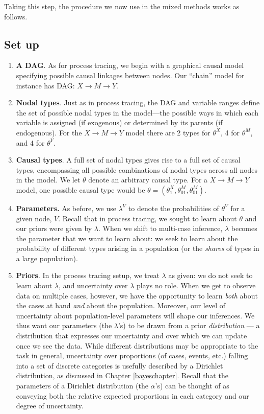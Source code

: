 \documentclass[
  12pt,
]{book}
\begin{document}
Taking this step, the procedure we now use in the mixed methods works as follows.

\hypertarget{set-up}{%
\subsection{Set up}\label{set-up}}

\begin{enumerate}
\def\labelenumi{\arabic{enumi}.}
\item
  \textbf{A DAG}. As for process tracing, we begin with a graphical causal model specifying possible causal linkages between nodes. Our ``chain'' model for instance has DAG: \(X \rightarrow M \rightarrow Y\).
\item
  \textbf{Nodal types}. Just as in process tracing, the DAG and variable ranges define the set of possible nodal types in the model---the possible ways in which each variable is assigned (if exogenous) or determined by its parents (if endogenous). For the \(X \rightarrow M \rightarrow Y\) model there are 2 types for \(\theta^X\), 4 for \(\theta^M\), and 4 for \(\theta^Y\).
\item
  \textbf{Causal types}. A full set of nodal types gives rise to a full set of causal types, encompassing all possible combinations of nodal types across all nodes in the model. We let \(\theta\) denote an arbitrary causal type. For a \(X \rightarrow M \rightarrow Y\) model, one possible causal type would be \(\theta = (\theta^X_1, \theta^M_{01}, \theta^M_{01})\).
\item
  \textbf{Parameters.} As before, we use \(\lambda^V\) to denote the probabilities of \(\theta^V\) for a given node, \(V\). Recall that in process tracing, we sought to learn about \(\theta\) and our priors were given by \(\lambda\). When we shift to multi-case inference, \(\lambda\) becomes the parameter that we want to learn about: we seek to learn about the probability of different types arising in a population (or the \emph{shares} of types in a large population).
\item
  \textbf{Priors}. In the process tracing setup, we treat \(\lambda\) as given: we do not seek to learn about \(\lambda\), and uncertainty over \(\lambda\) plays no role. When we get to observe data on multiple cases, however, we have the opportunity to learn \emph{both} about the cases at hand \emph{and} about the population. Moreover, our level of uncertainty about population-level parameters will shape our inferences. We thus want our parameters (the \(\lambda\)'s) to be drawn from a prior \emph{distribution} --- a distribution that expresses our uncertainty and over which we can update once we see the data. While different distributions may be appropriate to the task in general, uncertainty over proportions (of cases, events, etc.) falling into a set of discrete categories is usefully described by a Dirichlet distribution, as discussed in Chapter \ref{bayeschapter}. Recall that the parameters of a Dirichlet distribution (the \(\alpha\)'s) can be thought of as conveying both the relative expected proportions in each category and our degree of uncertainty.
\end{enumerate}
\end{document}

